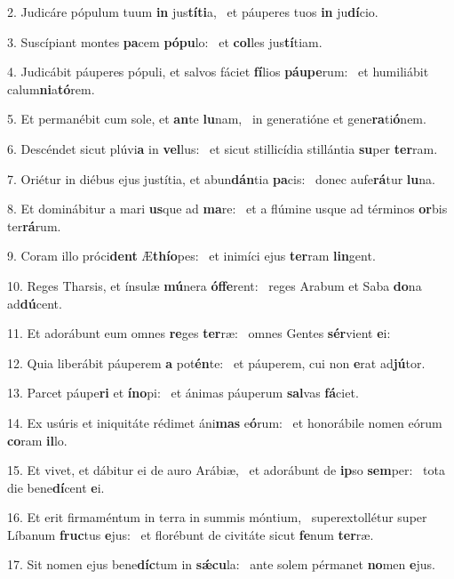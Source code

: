 2. Judicáre pópulum tuum \textbf{in} jus\textbf{tí}\textbf{ti}a, \ast\  et páuperes tuos \textbf{in} ju\textbf{dí}cio.\

3. Suscípiant montes \textbf{pa}cem \textbf{pó}\textbf{pu}lo: \ast\  et \textbf{col}les jus\textbf{tí}tiam.\

4. Judicábit páuperes pópuli, et salvos fáciet \textbf{fí}lios \textbf{páu}\textbf{pe}rum: \ast\  et humiliábit calum\textbf{ni}a\textbf{tó}rem.\

5. Et permanébit cum sole, et \textbf{an}te \textbf{lu}nam, \ast\  in generatióne et gene\textbf{ra}ti\textbf{ó}nem.\

6. Descéndet sicut plúvi\textbf{a} in \textbf{vel}lus: \ast\  et sicut stillicídia stillántia \textbf{su}per \textbf{ter}ram.\

7. Oriétur in diébus ejus justítia, et abun\textbf{dán}tia \textbf{pa}cis: \ast\  donec aufe\textbf{rá}tur \textbf{lu}na.\

8. Et dominábitur a mari \textbf{us}que ad \textbf{ma}re: \ast\  et a flúmine usque ad términos \textbf{or}bis ter\textbf{rá}rum.\

9. Coram illo próci\textbf{dent} Æ\textbf{thí}\textbf{o}pes: \ast\  et inimíci ejus \textbf{ter}ram \textbf{lin}gent.\

10. Reges Tharsis, et ínsulæ \textbf{mú}nera \textbf{óf}\textbf{fe}rent: \ast\  reges Arabum et Saba \textbf{do}na ad\textbf{dú}cent.\

11. Et adorábunt eum omnes \textbf{re}ges \textbf{ter}ræ: \ast\  omnes Gentes \textbf{sér}vient \textbf{e}i:\

12. Quia liberábit páuperem \textbf{a} pot\textbf{én}te: \ast\  et páuperem, cui non \textbf{e}rat ad\textbf{jú}tor.\

13. Parcet páupe\textbf{ri} et \textbf{ín}\textbf{o}pi: \ast\  et ánimas páuperum \textbf{sal}vas \textbf{fá}ciet.\

14. Ex usúris et iniquitáte rédimet áni\textbf{mas} e\textbf{ó}rum: \ast\  et honorábile nomen eórum \textbf{co}ram \textbf{il}lo.\

15. Et vivet, et dábitur ei de auro Arábiæ, \dag\  et adorábunt de \textbf{ip}so \textbf{sem}per: \ast\  tota die bene\textbf{dí}cent \textbf{e}i.\

16. Et erit firmaméntum in terra in summis móntium, \dag\  superextollétur super Líbanum \textbf{fruc}tus \textbf{e}jus: \ast\  et florébunt de civitáte sicut \textbf{fe}num \textbf{ter}ræ.\

17. Sit nomen ejus bene\textbf{díc}tum in \textbf{sǽ}\textbf{cu}la: \ast\  ante solem pérmanet \textbf{no}men \textbf{e}jus.\

